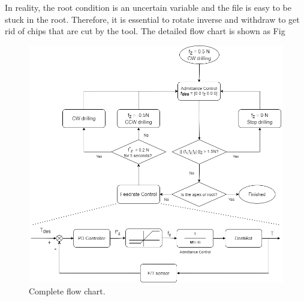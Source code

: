 \par
In reality, the root condition is an uncertain variable and the file is easy to be stuck in the root. Therefore, it is essential to rotate inverse and withdraw to get rid of chips that are cut by the tool. The detailed flow chart is shown as Fig
\begin{figure}[htbp]
\begin{center}
\includegraphics[width=1\linewidth]{Images/complete flow chart.png}
\end{center}
\caption{
Complete flow chart.
}\label{fig: complete_flowchart}
\end{figure}

